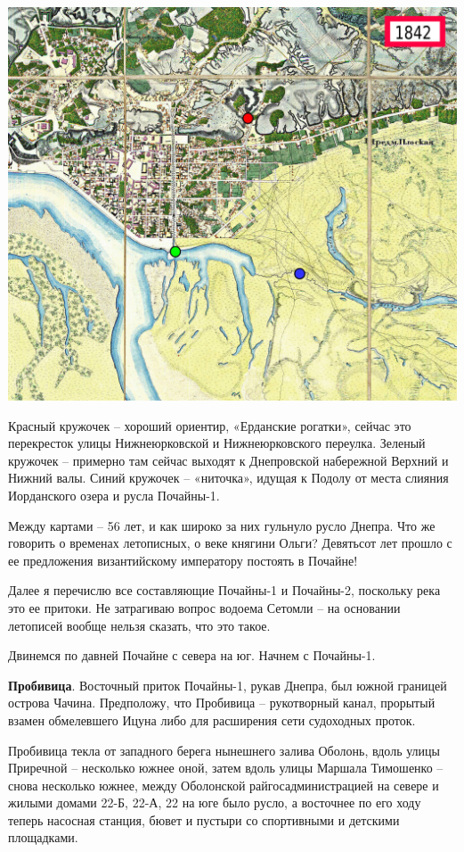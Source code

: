 \begin{center}
\includegraphics[width=0.92\linewidth]{chast-colebanie-osnov/pochayna/1842-small.jpg}
\end{center}

Красный кружочек – хороший ориентир, «Ерданские рогатки», сейчас это перекресток улицы Нижнеюрковской и Нижнеюрковского переулка. Зеленый кружочек – примерно там сейчас выходят к Днепровской набережной Верхний и Нижний валы. Синий кружочек – «ниточка», идущая к Подолу от места слияния Иорданского озера и русла Почайны-1.
 
Между картами – 56 лет, и как широко за них гульнуло русло Днепра. Что же говорить о временах летописных, о веке княгини Ольги? Девятьсот лет прошло с ее предложения византийскому императору постоять в Почайне!

Далее я перечислю все составляющие Почайны-1 и Почайны-2, поскольку река это ее притоки. Не затрагиваю вопрос водоема Сетомли – на основании летописей вообще нельзя сказать, что это такое.

Двинемся по давней Почайне с севера на юг. Начнем с Почайны-1.




\textbf{Пробивица}. Восточный приток Почайны-1, рукав Днепра, был южной границей острова Чачина. Предположу, что Пробивица – рукотворный канал, прорытый взамен обмелевшего Ицуна либо для расширения сети судоходных проток.

Пробивица текла от западного берега нынешнего залива Оболонь, вдоль улицы Приречной – несколько южнее оной, затем вдоль улицы Маршала Тимошенко – снова несколько южнее, между Оболонской райгосадминистрацией на севере и жилыми домами 22-Б, 22-А, 22 на юге было русло, а восточнее по его ходу теперь насосная станция, бювет и пустыри со спортивными и детскими площадками.

